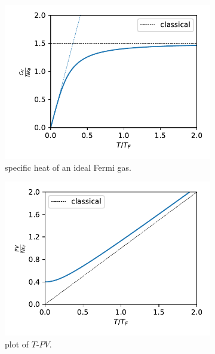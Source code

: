 \begin{itemize}
	\begin{figure}[H]
		\centering
		\begin{subfigure}{0.4\linewidth}
			\centering
			\includegraphics[scale=0.65]{figures/specific heat of an ideal Fermi gas.pdf}
			\caption{specific heat of an ideal Fermi gas.}
			\label{figure 8.2 (a)}
		\end{subfigure}
		\begin{subfigure}{0.4\linewidth}
			\centering
			\includegraphics[scale=0.65]{figures/plot of T-PV (Fermi).pdf}
			\caption{plot of $T$-$P V$.}
		\end{subfigure}
		\caption{}
	\end{figure}
\end{itemize}

